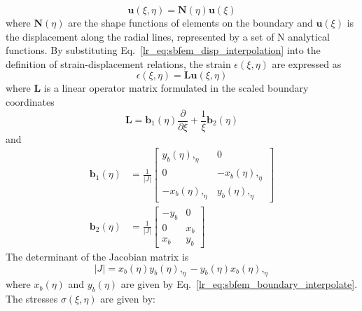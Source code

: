 \begin{equation}
    \mathbf{u}(\xi,\eta) = \mathbf{N}(\eta) \mathbf{u}(\xi)
    \label{lr_eq:sbfem_disp_interpolation}
\end{equation}
%
where $\mathbf{N}(\eta)$ are the shape functions of elements on the boundary and $\mathbf{u}(\xi)$ is the displacement along the radial lines, represented by a set of N analytical functions.
By substituting Eq.~\ref{lr_eq:sbfem_disp_interpolation} into the definition of strain-displacement relations, the strain $\epsilon(\xi,\eta)$ are expressed as
\begin{equation}
    \epsilon(\xi,\eta) = \mathbf{Lu}(\xi,\eta)
    \label{lr_eq:sbfem_strain_disp_relation}
\end{equation}
%
where $\mathbf{L}$ is a linear operator matrix formulated in the scaled boundary coordinates
\begin{equation}
    \mathbf{L} =    \mathbf{b}_1(\eta) \frac{\partial}{\partial \xi} +
                    \frac{1}{\xi} \mathbf{b}_2(\eta)
    \label{lr_eq:sbfem_l_operator}
\end{equation}
%
and
\begin{equation}
    \begin{aligned}
    \mathbf{b}_1(\eta) & = \frac{1}{|J|}
            \begin{bmatrix}
                y_b(\eta),_{\eta}   &   0   \\
                0   &   -x_b(\eta),_{\eta}  \\
                -x_b(\eta),_{\eta} & y_b(\eta),_{\eta}
            \end{bmatrix} \\
    \mathbf{b}_2(\eta) & = \frac{1}{|J|}
            \begin{bmatrix}
                -y_b    &   0   \\
                0       &   x_b \\
                x_b     &   y_b
            \end{bmatrix}
    \end{aligned}
    \label{lr_eq:sbfem_little_b}
\end{equation}
%
The determinant of the Jacobian matrix is
\begin{equation}
    |J| = x_b(\eta)y_b(\eta),_{\eta}
        - y_b(\eta)x_b(\eta),_{\eta}
    \label{lr_eq:sbfem_Jdet}
\end{equation}
%
where $x_b(\eta)$ and $y_b(\eta)$ are given by Eq.~\ref{lr_eq:sbfem_boundary_interpolate}.
The stresses $\sigma(\xi,\eta)$ are given by:
